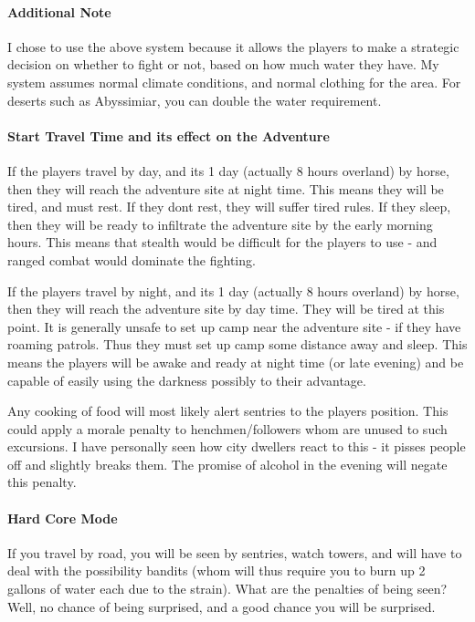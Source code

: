 \begin{multicols}{2}
\paragraph{Additional Note} I chose to use the above system because it allows the players to make a strategic decision on whether to fight or not, based on how much water they have. My system assumes normal climate conditions, and normal clothing for the area. For deserts such as Abyssimiar, you can double the water requirement.

\paragraph{Start Travel Time and its effect on the Adventure} If the players travel by day, and its 1 day (actually 8 hours overland) by horse, then they will reach the adventure site at night time. This means they will be tired, and must rest. If they dont rest, they will suffer tired rules. If they sleep, then they will be ready to infiltrate the adventure site by the early morning hours. This means that stealth would be difficult for the players to use - and ranged combat would dominate the fighting.

If the players travel by night, and its 1 day (actually 8 hours overland) by horse, then they will reach the adventure site by day time. They will be tired at this point. It is generally unsafe to set up camp near the adventure site - if they have roaming patrols. Thus they must set up camp some distance away and sleep. This means the players will be awake and ready at night time (or late evening) and be capable of easily using the darkness possibly to their advantage.

Any cooking of food will most likely alert sentries to the players position. This could apply a morale penalty to henchmen/followers whom are unused to such excursions. I have personally seen how city dwellers react to this - it pisses people off and slightly breaks them. The promise of alcohol in the evening will negate this penalty.

\paragraph{Hard Core Mode} If you travel by road, you will be seen by sentries, watch towers, and will have to deal with the possibility bandits (whom will thus require you to burn up 2 gallons of water each due to the strain). What are the penalties of being seen? Well, no chance of being surprised, and a good chance you will be surprised.


\end{multicols}
